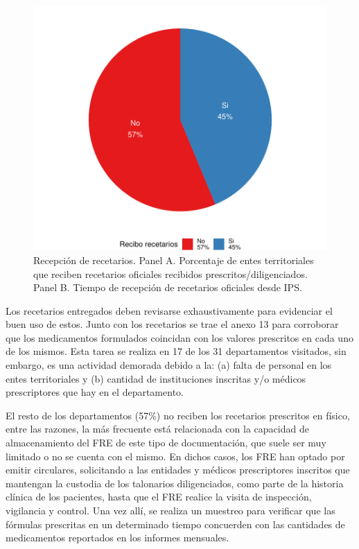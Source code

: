 \documentclass[
]{book}
\begin{document}
\begin{figure}

{\centering \includegraphics[width=1\linewidth]{InformeFinal_files/figure-latex/ReciboRecetariosInstituciones-1} 

}

\caption{Recepción de recetarios. Panel A. Porcentaje de entes territoriales que reciben recetarios oficiales recibidos prescritos/diligenciados. Panel B. Tiempo de recepción de recetarios oficiales desde IPS.}\label{fig:ReciboRecetariosInstituciones}
\end{figure}

Los recetarios entregados deben revisarse exhaustivamente para evidenciar el buen uso de estos. Junto con los recetarios se trae el anexo 13 para corroborar que los medicamentos formulados coincidan con los valores prescritos en cada uno de los mismos. Esta tarea se realiza en 17 de los 31 departamentos visitados, sin embargo, es una actividad demorada debido a la: (a) falta de personal en los entes territoriales y (b) cantidad de instituciones inscritas y/o médicos prescriptores que hay en el departamento.

El resto de los departamentos (57\%) no reciben los recetarios prescritos en físico, entre las razones, la más frecuente está relacionada con la capacidad de almacenamiento del FRE de este tipo de documentación, que suele ser muy limitado o no se cuenta con el mismo. En dichos casos, los FRE han optado por emitir circulares, solicitando a las entidades y médicos prescriptores inscritos que mantengan la custodia de los talonarios diligenciados, como parte de la historia clínica de los pacientes, hasta que el FRE realice la visita de inspección, vigilancia y control. Una vez allí, se realiza un muestreo para verificar que las fórmulas prescritas en un determinado tiempo concuerden con las cantidades de medicamentos reportados en los informes mensuales.
\end{document}
